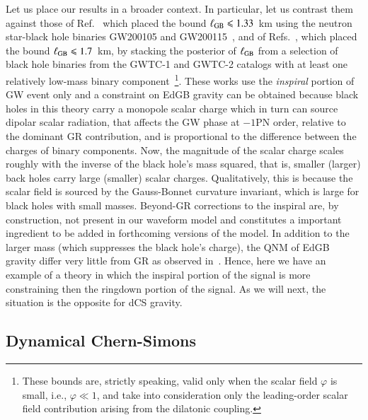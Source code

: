 \documentclass[twocolumn,
               prd,
               aps,
               superscriptaddress,
               tightenlines,
               nofootinbib,
               eqsecnum,
               amsfonts,
               amsmath,
               longbibliography]{revtex4-1}
\begin{document}
Let us place our results in a broader context. In particular, let us contrast
them against those of Ref.~\cite{Lyu:2022gdr} which placed the bound
%
$\ell_{\rm GB} \leqslant 1.33$~km
%
using the neutron star-black hole binaries GW200105 and GW200115~\cite{LIGOScientific:2021qlt}, and
of Refs.~\cite{Nair:2019iur,Perkins:2021mhb}, which placed the bound
%
$\ell_{\rm GB} \leqslant 1.7$~km,
%
by stacking the posterior of $\ell_{\rm GB}$ from a  selection of black hole binaries from the GWTC-1 and GWTC-2 catalogs
with at least one relatively low-mass binary component~\cite{}\footnote{These bounds
are, strictly speaking, valid only when the scalar field $\varphi$ is small, i.e., $\varphi \ll 1$, and
take into consideration only the leading-order scalar field contribution arising from the dilatonic coupling.}.
%
These works use the \emph{inspiral} portion of GW event only and a constraint
on EdGB gravity can be obtained because black holes in this theory carry a
monopole scalar charge which in turn can source dipolar scalar radiation,
that affects the GW phase at $-1$PN order, relative to the dominant GR contribution, and
is proportional to the difference between the charges of binary components.
%
Now, the magnitude of the scalar charge scales roughly with the inverse of the black hole's mass squared, that is,
smaller (larger) back holes carry large (smaller) scalar charges. Qualitatively, this is because the scalar field
is sourced by the Gauss-Bonnet curvature invariant, which is large for black holes with small masses.
%
Beyond-GR corrections to the inspiral are, by construction, not present in our
waveform model and constitutes a important ingredient to be added in forthcoming
versions of the model.
%
In addition to the larger mass (which suppresses the black hole's charge), the
QNM of EdGB gravity differ very little from GR as observed in~\cite{Blazquez-Salcedo:2016enn}.
%
Hence, here we have an example of a theory in which the inspiral portion of the signal
is more constraining then the ringdown portion of the signal.
%
As we will next, the situation is the opposite for dCS gravity.


\subsection{Dynamical Chern-Simons}
\label{sec:results_dcs}
\end{document}
